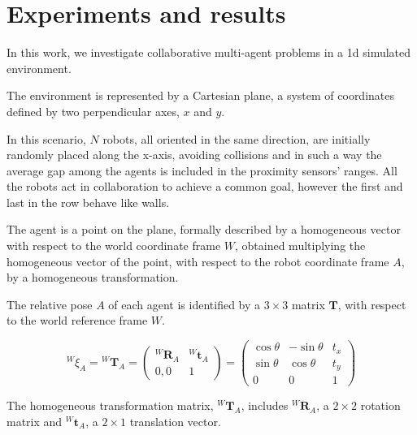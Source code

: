 \chapter{Experiments and results}
\label{chap:experiments}


In this work, we investigate collaborative multi-agent problems in a \gls{1d} 
simulated environment.

The environment is represented by a Cartesian plane, a system of coordinates
defined by two perpendicular axes, $x$ and $y$. 

In this scenario, $N$ robots, all oriented in the same direction, are initially 
randomly placed along the x-axis, avoiding collisions and in such a way the 
average gap among the agents is included in the proximity sensors' ranges. 
All the robots act in collaboration to achieve a common goal, however the first 
and last in the row behave like walls. %

The agent is a point on the plane, formally described by a homogeneous vector 
with respect to the world coordinate frame $W$, obtained multiplying the 
homogeneous vector of the point, with respect to the robot coordinate frame 
$A$, by a homogeneous transformation. 

The relative pose $A$ of each agent is identified by a $3 \times 3$ matrix 
$\mathbf{T}$, with respect to the world reference frame $W$. 

\begin{Equation}[!htb]
	\centering
	\begin{equation}
	{^W\!\xi_A} = {^W\!\mathbf{T}_A} 
	=
	\begin{pmatrix}
	^W\!\mathbf{R}_A & ^W\!\mathbf{t}_A\\
	0, 0 & 1
	\end{pmatrix}
	=
	\begin{pmatrix}
	\cos \theta & - \sin \theta & t_x\\
	\sin \theta & \cos \theta & t_y\\
	0 & 0 & 1
	\end{pmatrix}
	\end{equation}
	\caption[Homogeneous transformation matrix.]{The homogeneous 
	transformation matrix, 	$^W\!\mathbf{T}_A$, includes $^W\!\mathbf{R}_A$, a 
	$2 \times 2$ rotation matrix and $^W\!\mathbf{t}_A$, a $2 \times 1$ 
	translation vector.}
	\label{eq:hommatrix}
\end{Equation}

